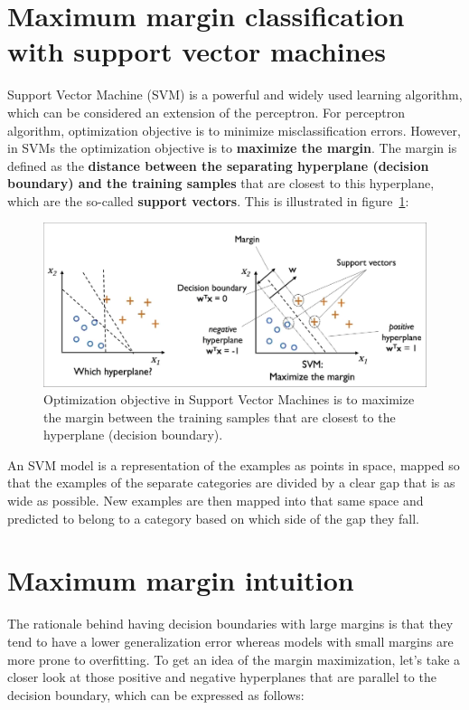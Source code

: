 \documentclass[11pt]{article}
\begin{document}
    \section{Maximum margin classification with support vector machines} \label{sec:max_marg_class}

    Support Vector Machine (SVM) is a powerful and widely used learning algorithm, which can be considered
    an extension of the perceptron.
    For perceptron algorithm, optimization objective is to minimize misclassification errors.
    However, in SVMs the optimization objective is to \textbf{maximize the margin}.
    The margin is defined as the \textbf{distance between the separating hyperplane (decision boundary) and the training
    samples} that are closest to this hyperplane, which are the so-called \textbf{support vectors}.
    This is illustrated in figure~\ref{fig:svm}:

    \begin{figure}[hbt!]
        \centering
        \includegraphics[width=1\linewidth,trim=4 4 4 4,clip]{img/svm.jpg}
        \caption{Optimization objective in Support Vector Machines is to maximize the margin between the training samples
        that are closest to the hyperplane (decision boundary).}
        \label{fig:svm}
    \end{figure}

    An SVM model is a representation of the examples as points in space, mapped so that the examples of the separate
    categories are divided by a clear gap that is as wide as possible.
    New examples are then mapped into that same space and predicted to belong to a category based on which side of
    the gap they fall.

    \section{Maximum margin intuition} \label{sec:max_marg_int}

    The rationale behind having decision boundaries with large margins is that they tend to have a lower
    generalization error whereas models with small margins are more prone to overfitting.
    To get an idea of the margin maximization, let's take a closer look at those positive and
    negative hyperplanes that are parallel to the decision boundary, which can be expressed as follows:
\end{document}
